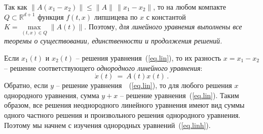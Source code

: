 \documentclass[12pt,a4paper]{article}
\newcommand{\re}{{\mathbb R}}
\begin{document}
Так как $\|A(x_1  -x_2)\| \le \|A\| \, \|x_1 - x_2\|$, то на любом компакте $Q\subset \re^{d+1}$
функция $f(t, x)$ липшицева по  $x$ с константой $K = \max\limits_{(t, x)\in Q} \|A(t)\|$. Поэтому, {\em для линейного
уравнения выполнены все теоремы о существовании, единственности и продолжения решений.}

Если $x_1(t)$ и $x_2(t)$ -- решения уравнения~(\ref{eq.lin}), то их разность $x = x_1 - x_2$ -- решение
соответствующего {\em однородного линейного уравнения}:
\begin{equation}\label{eq.linh}
\dot x(t) \ = \ A(t)x(t) \, .
\end{equation}
Обратно, если $y$ -- решение уравнения~~(\ref{eq.lin}), то для любого решения
$x$ однородного уравнения, сумма $y+x$ -- решение уравнения~(\ref{eq.lin}).
Таким образом, все решения неоднородного линейного уравнения имеют вид суммы одного
частного решения и произвольного решения однородного уравнения. Поэтому мы начнем с изучения
однородных уравнений~(\ref{eq.linh}).
\end{document}
